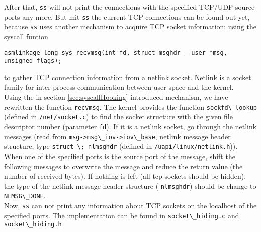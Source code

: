 After that, \texttt{ss} will not print the connections with the specified TCP/UDP source ports any more. But mit \texttt{ss} the current TCP connections can be found out yet, because \texttt{ss} uses another mechanism to acquire TCP socket information: using the syscall funtion 
\begin{center}
\lstset{escapechar=,style=customc}
\begin{lstlisting}
asmlinkage long sys_recvmsg(int fd, struct msghdr __user *msg, unsigned flags);
\end{lstlisting}
\end{center}
to gather TCP connection information from a netlink socket. Netlink is a socket family for inter-process communication between user space and the kernel.\\
Using the in section \ref{sec:syscallHooking} introduced mechanism, we have rewritten the function \verb+recvmsg+. The kernel provides the function \verb+sockfd\_lookup+ (defined in \verb+/net/socket.c+) to find the socket structure with the given file descriptor number (parameter \verb+fd+). If it is a netlink socket, go through the netlink messages (read from \verb+msg->msg\_iov->iov\_base+, netlink message header structure, type \verb+struct \; nlmsghdr+ (defined in \verb+/uapi/linux/netlink.h+)). When one of the specified ports is the source port of the message, shift the following messages to overwrite the message and reduce the return value (the number of received bytes). If nothing is left (all tcp sockets should be hidden), the type of the netlink message header structure ( \verb+nlmsghdr+) should be change to \verb+NLMSG\_DONE+. \\
Now, \texttt{ss} can not print any information about TCP sockets on the localhost of the specified ports. The implementation can be found in \verb+socket\_hiding.c+ and \verb+socket\_hiding.h+\\

